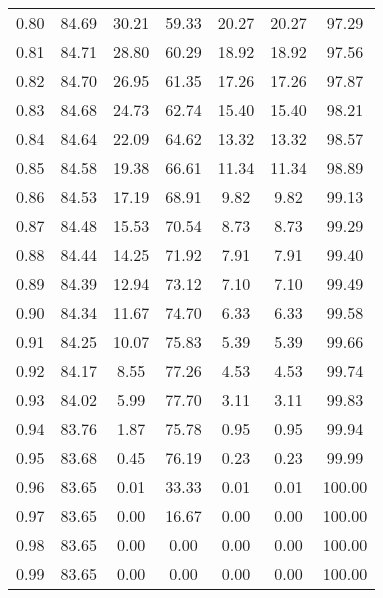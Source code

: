 \begin{tabular}{|c|c|c|c|c|c|c|}
      0.80 &     84.69 &     30.21 &      59.33 &   20.27 &      20.27 &         97.29 \\
      0.81 &     84.71 &     28.80 &      60.29 &   18.92 &      18.92 &         97.56 \\
      0.82 &     84.70 &     26.95 &      61.35 &   17.26 &      17.26 &         97.87 \\
      0.83 &     84.68 &     24.73 &      62.74 &   15.40 &      15.40 &         98.21 \\
      0.84 &     84.64 &     22.09 &      64.62 &   13.32 &      13.32 &         98.57 \\
      0.85 &     84.58 &     19.38 &      66.61 &   11.34 &      11.34 &         98.89 \\
      0.86 &     84.53 &     17.19 &      68.91 &    9.82 &       9.82 &         99.13 \\
      0.87 &     84.48 &     15.53 &      70.54 &    8.73 &       8.73 &         99.29 \\
      0.88 &     84.44 &     14.25 &      71.92 &    7.91 &       7.91 &         99.40 \\
      0.89 &     84.39 &     12.94 &      73.12 &    7.10 &       7.10 &         99.49 \\
      0.90 &     84.34 &     11.67 &      74.70 &    6.33 &       6.33 &         99.58 \\
      0.91 &     84.25 &     10.07 &      75.83 &    5.39 &       5.39 &         99.66 \\
      0.92 &     84.17 &      8.55 &      77.26 &    4.53 &       4.53 &         99.74 \\
      0.93 &     84.02 &      5.99 &      77.70 &    3.11 &       3.11 &         99.83 \\
      0.94 &     83.76 &      1.87 &      75.78 &    0.95 &       0.95 &         99.94 \\
      0.95 &     83.68 &      0.45 &      76.19 &    0.23 &       0.23 &         99.99 \\
      0.96 &     83.65 &      0.01 &      33.33 &    0.01 &       0.01 &        100.00 \\
      0.97 &     83.65 &      0.00 &      16.67 &    0.00 &       0.00 &        100.00 \\
      0.98 &     83.65 &      0.00 &       0.00 &    0.00 &       0.00 &        100.00 \\
      0.99 &     83.65 &      0.00 &       0.00 &    0.00 &       0.00 &        100.00 \\
\bottomrule
\end{tabular}
